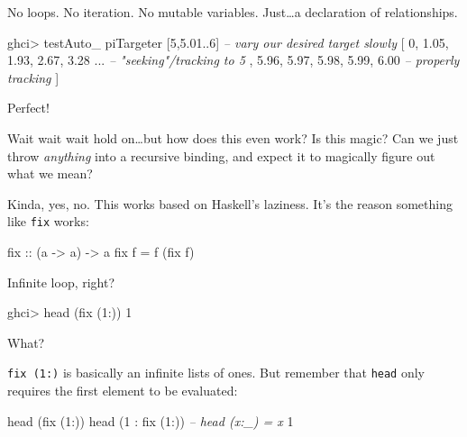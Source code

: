 \documentclass[]{article}
\newenvironment{Shaded}{}{}
\newcommand{\CommentTok}[1]{\textcolor[rgb]{0.38,0.63,0.69}{\textit{#1}}}
\newcommand{\DecValTok}[1]{\textcolor[rgb]{0.25,0.63,0.44}{#1}}
\newcommand{\FloatTok}[1]{\textcolor[rgb]{0.25,0.63,0.44}{#1}}
\newcommand{\FunctionTok}[1]{\textcolor[rgb]{0.02,0.16,0.49}{#1}}
\newcommand{\NormalTok}[1]{#1}
\newcommand{\OtherTok}[1]{\textcolor[rgb]{0.00,0.44,0.13}{#1}}
\begin{document}
No loops. No iteration. No mutable variables. Just\ldots{}a declaration of
relationships.

\begin{Shaded}
\begin{Highlighting}[]
\NormalTok{ghci}\FunctionTok{>}\NormalTok{ testAuto_ piTargeter [}\DecValTok{5}\NormalTok{,}\FloatTok{5.01}\FunctionTok{..}\DecValTok{6}\NormalTok{]      }\CommentTok{-- vary our desired target slowly}
\NormalTok{[ }\DecValTok{0}\NormalTok{, }\FloatTok{1.05}\NormalTok{, }\FloatTok{1.93}\NormalTok{, }\FloatTok{2.67}\NormalTok{, }\FloatTok{3.28} \FunctionTok{...}         \CommentTok{-- "seeking"/tracking to 5}
\NormalTok{, }\FloatTok{5.96}\NormalTok{, }\FloatTok{5.97}\NormalTok{, }\FloatTok{5.98}\NormalTok{, }\FloatTok{5.99}\NormalTok{, }\FloatTok{6.00}          \CommentTok{-- properly tracking}
\NormalTok{]}
\end{Highlighting}
\end{Shaded}

Perfect!

Wait wait wait hold on\ldots{}but how does this even work? Is this magic? Can we
just throw \emph{anything} into a recursive binding, and expect it to magically
figure out what we mean?

Kinda, yes, no. This works based on Haskell's laziness. It's the reason
something like \texttt{fix} works:

\begin{Shaded}
\begin{Highlighting}[]
\OtherTok{fix ::}\NormalTok{ (a }\OtherTok{->}\NormalTok{ a) }\OtherTok{->}\NormalTok{ a}
\NormalTok{fix f }\FunctionTok{=}\NormalTok{ f (fix f)}
\end{Highlighting}
\end{Shaded}

Infinite loop, right?

\begin{Shaded}
\begin{Highlighting}[]
\NormalTok{ghci}\FunctionTok{>}\NormalTok{ head (fix (}\DecValTok{1}\FunctionTok{:}\NormalTok{))}
\DecValTok{1}
\end{Highlighting}
\end{Shaded}

What?

\texttt{fix\ (1:)} is basically an infinite lists of ones. But remember that
\texttt{head} only requires the first element to be evaluated:

\begin{Shaded}
\begin{Highlighting}[]
\NormalTok{head (fix (}\DecValTok{1}\FunctionTok{:}\NormalTok{))}
\NormalTok{head (}\DecValTok{1} \FunctionTok{:}\NormalTok{ fix (}\DecValTok{1}\FunctionTok{:}\NormalTok{))     }\CommentTok{-- head (x:_) = x}
\DecValTok{1}
\end{Highlighting}
\end{Shaded}
\end{document}
